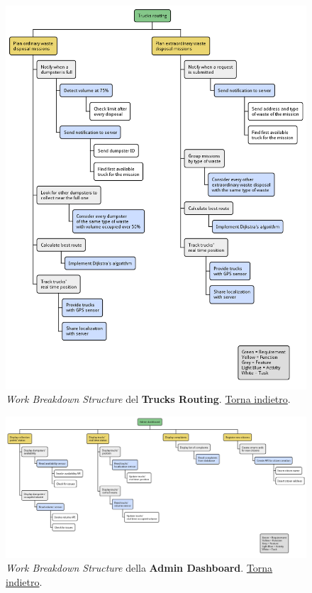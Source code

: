 \begin{figure}[H]
    \centering
    \includegraphics[width=\textwidth]{uml/wbs-trucks-routing.pm}
    \caption{\textit{Work Breakdown Structure} del \textbf{Trucks Routing}. \hyperlink{back:uml/wbs-trucks-routing}{Torna indietro}.}
    \label{fig:uml/wbs-trucks-routing}
\end{figure}


\begin{figure}[H]
    \centering
    \includegraphics[width=\textwidth]{uml/wbs-admin-dashboard.pm}
    \caption{\textit{Work Breakdown Structure} della \textbf{Admin Dashboard}. \hyperlink{back:uml/wbs-admin-dashboard}{Torna indietro}.}
    \label{fig:uml/wbs-admin-dashboard}
\end{figure}


